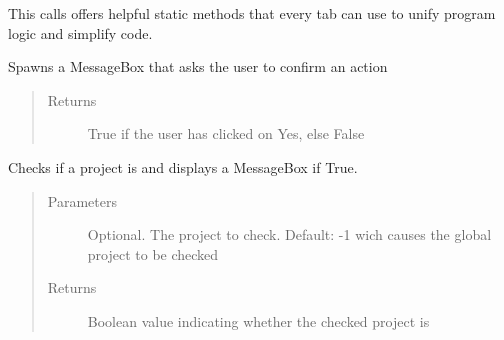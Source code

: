 \documentclass[letterpaper,10pt,english]{sphinxmanual}
\begin{document}
\begin{fulllineitems}
\label{\detokenize{src:src.Toolbox.Toolbox}}
This calls offers helpful static methods that every tab can use to unify program logic and simplify code.

\begin{fulllineitems}
\label{\detokenize{src:src.Toolbox.Toolbox.askUserConfirmAction}}
Spawns a MessageBox that asks the user to confirm an action
\begin{quote}\begin{description}
\item[{Returns}] \leavevmode
True if the user has clicked on Yes, else False

\end{description}\end{quote}

\end{fulllineitems}


\begin{fulllineitems}
\label{\detokenize{src:src.Toolbox.Toolbox.checkProjectIsNone}}
Checks if a project is  and displays a MessageBox if True.
\begin{quote}\begin{description}
\item[{Parameters}] \leavevmode
{} \textendash{} Optional. The project to check. Default: -1 wich causes the global project to be checked

\item[{Returns}] \leavevmode
Boolean value indicating whether the checked project is 

\end{description}\end{quote}

\end{fulllineitems}



\end{fulllineitems}
\end{document}
